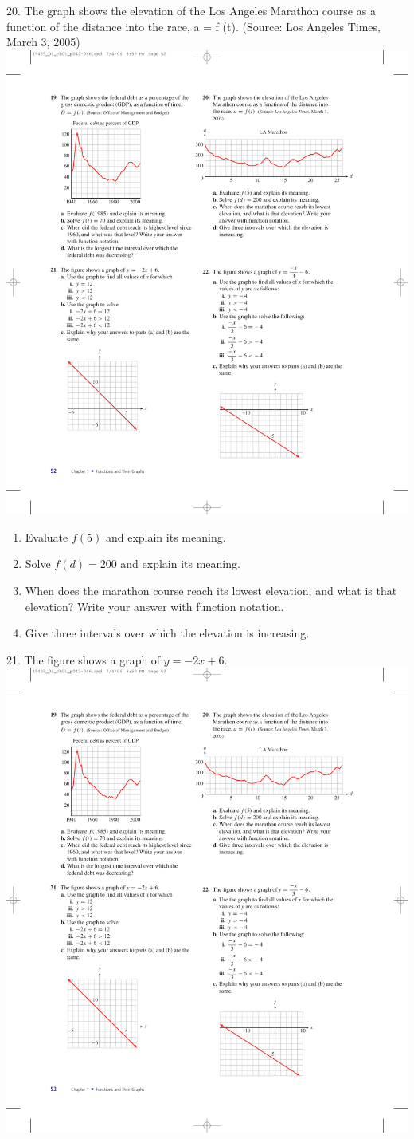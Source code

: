 \documentclass[10pt,]{book}
\theoremstyle{plain}
\theoremstyle{definition}
\theoremstyle{definition}
\theoremstyle{definition}
\theoremstyle{definition}
\numberwithin{equation}{part}
\begin{document}
\begin{exerciselist}
\begin{enumerate}[label=*\alph**]
\end{enumerate}
%
\item[20.]\hypertarget{exercise-177}{}The graph shows the elevation of the Los Angeles Marathon course as a function of the distance into the race, a = f (t). (Source: Los Angeles Times, March 3, 2005) \includegraphics[width=0.8\linewidth]{images/fig-ex-1-3-20}
 \leavevmode%
\begin{enumerate}[label=*\alph**]
\item\hypertarget{li-736}{}Evaluate \(f (5)\) and explain its meaning.%
\item\hypertarget{li-737}{}Solve \(f (d) = 200\) and explain its meaning.%
\item\hypertarget{li-738}{}When does the marathon course reach its lowest elevation, and what is that elevation? Write your answer with function notation.%
\item\hypertarget{li-739}{}Give three intervals over which the elevation is increasing.%
\end{enumerate}
%
\par\smallskip
\item[21.]\hypertarget{exercise-178}{}The figure shows a graph of \(y = -2x + 6\). \includegraphics[width=0.45\linewidth]{images/fig-ex-1-3-21}

\end{exerciselist}
\end{document}
